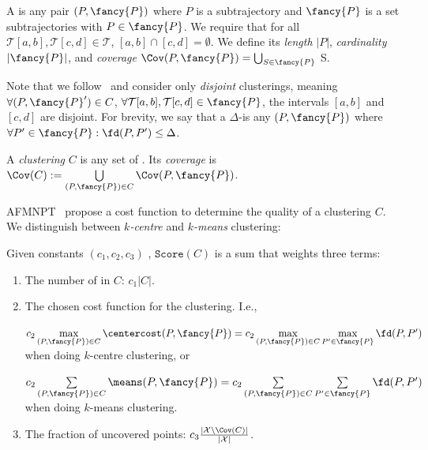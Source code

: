 \documentclass[english, thm-restate]{lipics-v2021}
\begin{document}
\begin{definition}
    A \pathlet  is any pair $(P, {\fancy{P}})$ where $P$ is a subtrajectory and ${\fancy{P}}$ is a set subtrajectories with $P \in {\fancy{P}}$. We require that for all $\mathcal{T}[a, b], \mathcal{T}[c, d] \in \mathcal{T}$, $[a, b] \cap [c, d] = \emptyset$.     
    We define its \emph{length} $|P|$, \emph{cardinality} $|{\fancy{P}}|$, and \emph{coverage} $\Cov(P, {\fancy{P}}) =  \bigcup_{S \in {\fancy{P}}}$ S. 
\end{definition}



\noindent
Note that we follow~\cite{agarwal2018subtrajectory, buchin2017clustering, buchin2020improved, buchin2011detecting} and consider only \emph{disjoint} clusterings, meaning $\forall (P, {\fancy{P}}') \in C$, $\forall \mathcal{T}[a, b], \mathcal{T}[c, d] \in {\fancy{P}}$, the intervals $[a, b]$ and $[c, d]$ are disjoint.
For brevity, we say that a $\Delta$-\pathlet is any \pathlet $(P, {\fancy{P}})$ where $\forall P' \in {\fancy{P}} : \fd(P, P') \leq \Delta$.

\begin{definition}
A \emph{clustering} $C$ is any set of \pathlets. 
Its \emph{coverage} is $\Cov(C) := \bigcup\limits_{(P, {\fancy{P}}) \in C} \Cov(P, {\fancy{P}})$. 
\end{definition}


\noindent
AFMNPT~\cite{agarwal2018subtrajectory} propose a cost function to determine the quality of a clustering $C$.
We distinguish between \emph{$k$-centre} and \emph{$k$-means} clustering: 

\begin{definition}
\label{def:score}
Given constants $(c_1, c_2, c_3)$ , 
$\texttt{Score}(C)$ is a sum that weights three terms:
    \begin{enumerate}
    \item The number of \pathlets in $C$: $c_1 |C|$.
\item The chosen cost function for the clustering. I.e.,
   
    $c_2 \max\limits_{(P, {\fancy{P}}) \in C} \centercost(P, {\fancy{P}}) = c_2 \max\limits_{(P, {\fancy{P}}) \in C} \max\limits_{P' \in {\fancy{P}}} \fd(P, P')$ when doing $k$-centre clustering, or 
    
         $c_2 \sum\limits_{(P, {\fancy{P}}) \in C} \means(P, {\fancy{P}})  = c_2 \sum\limits_{(P, {\fancy{P}}) \in C} \sum\limits_{P' \in {\fancy{P}}} \fd(P, P')$ when doing $k$-means clustering. 
\item The fraction of uncovered points: $c_3 \frac{| \mathcal{X} \backslash \Cov(C) |}{|\mathcal{X}|}$.
\end{enumerate}
\end{definition}
\end{document}
